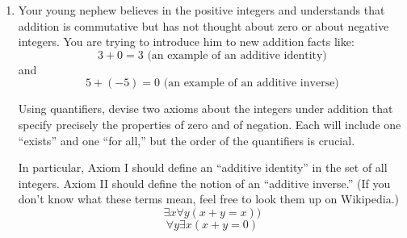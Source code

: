 \documentclass[12pt]{article}
\begin{document}
\begin{enumerate}
    \item Your young nephew believes in the positive integers and understands that addition is commutative but has not thought about zero or about negative integers. You are trying to introduce him to new addition facts like: $$3 + 0 = 3 \text{ (an example of an additive identity)}$$ and $$5 + (-5) = 0 \text{ (an example of an additive inverse)}$$

        Using quantifiers, devise two axioms about the integers under addition that specify precisely the properties of zero and of negation. Each will include one ``exists'' and one ``for all,'' but the order of the quantifiers is crucial.

        In particular, Axiom I should define an ``additive identity'' in the set of all integers. Axiom II should define the notion of an ``additive inverse.'' (If you don't know what these terms mean, feel free to look them up on Wikipedia.) 
        \[ \exists x \forall y (x + y = x) ) \]
        \[ \forall y \exists x  (x + y = 0) \]
\end{enumerate}
\end{document}
